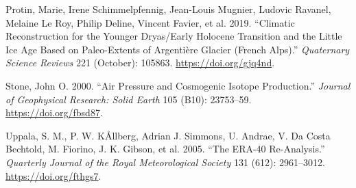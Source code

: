 \documentclass[
]{book}
\newlength{\cslhangindent}
\newlength{\cslentryspacingunit} %
\newenvironment{CSLReferences}[2] %
 {%
  \setlength{\parindent}{0pt}
  \ifodd #1
  \let\oldpar\par
  \def\par{\hangindent=\cslhangindent\oldpar}
  \fi
  \setlength{\parskip}{#2\cslentryspacingunit}
 }%
 {}
\begin{document}
\begin{CSLReferences}{1}{0}
\leavevmode{}%
Protin, Marie, Irene Schimmelpfennig, Jean-Louis Mugnier, Ludovic Ravanel, Melaine Le Roy, Philip Deline, Vincent Favier, et al. 2019. {``Climatic Reconstruction for the {Younger Dryas}/{Early Holocene} Transition and the {Little Ice Age} Based on Paleo-Extents of {Argentière} Glacier ({French Alps}).''} \emph{Quaternary Science Reviews} 221 (October): 105863. \url{https://doi.org/gjq4nd}.

\leavevmode{}%
Stone, John O. 2000. {``Air Pressure and Cosmogenic Isotope Production.''} \emph{Journal of Geophysical Research: Solid Earth} 105 (B10): 23753--59. \url{https://doi.org/fbsd87}.

\leavevmode{}%
Uppala, S. M., P. W. KÅllberg, Adrian J. Simmons, U. Andrae, V. Da Costa Bechtold, M. Fiorino, J. K. Gibson, et al. 2005. {``The {ERA-40} Re-Analysis.''} \emph{Quarterly Journal of the Royal Meteorological Society} 131 (612): 2961--3012. \url{https://doi.org/fthgs7}.

\end{CSLReferences}
\end{document}
